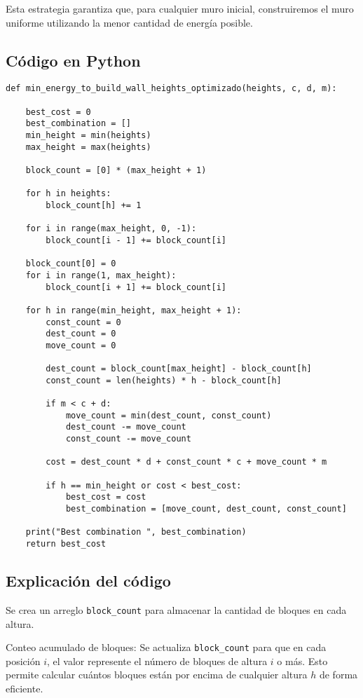 \documentclass[a4paper,12pt]{article}
\begin{document}
Esta estrategia garantiza que, para cualquier muro inicial, construiremos el muro uniforme utilizando la menor cantidad de energía posible.

\subsection{Código en Python}
\begin{lstlisting}
def min_energy_to_build_wall_heights_optimizado(heights, c, d, m):

	best_cost = 0
	best_combination = []
	min_height = min(heights)
	max_height = max(heights)

	block_count = [0] * (max_height + 1)

	for h in heights:
		block_count[h] += 1

	for i in range(max_height, 0, -1):
		block_count[i - 1] += block_count[i]

	block_count[0] = 0
	for i in range(1, max_height):
		block_count[i + 1] += block_count[i]

	for h in range(min_height, max_height + 1):
		const_count = 0
		dest_count = 0
		move_count = 0

		dest_count = block_count[max_height] - block_count[h]
		const_count = len(heights) * h - block_count[h]

		if m < c + d:
			move_count = min(dest_count, const_count)
			dest_count -= move_count
			const_count -= move_count

		cost = dest_count * d + const_count * c + move_count * m

		if h == min_height or cost < best_cost:
			best_cost = cost
			best_combination = [move_count, dest_count, const_count]

	print("Best combination ", best_combination)
	return best_cost
\end{lstlisting}

\subsection{Explicación del código}
	
Se crea un arreglo \texttt{block\_count} para almacenar la cantidad de bloques en cada altura.

Conteo acumulado de bloques: Se actualiza \texttt{block\_count} para que en cada posición \(i\), el valor represente el número de bloques de altura \(i\) o más. Esto permite calcular cuántos bloques están por encima de cualquier altura \(h\) de forma eficiente.
\end{document}
